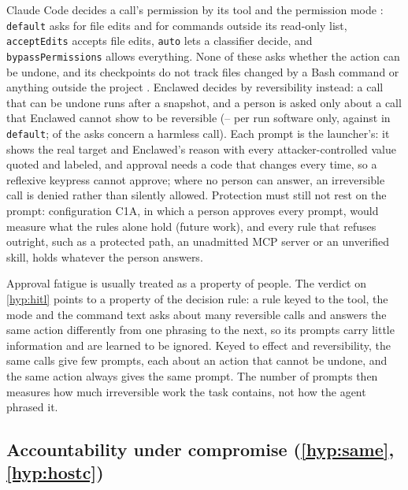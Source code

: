 \documentclass[11pt]{article}
\newcommand{\sys}{Enclawed}
\begin{document}
Claude Code decides a call's permission by its tool and the permission
mode \cite{cc-permission-modes}: \texttt{default} asks for file edits and
for commands outside its read-only list, \texttt{acceptEdits} accepts
file edits, \texttt{auto} lets a classifier decide, and
\texttt{bypassPermissions} allows everything. None of these asks whether
the action can be undone, and its checkpoints do not track files changed
by a Bash command or anything outside the project \cite{cc-checkpointing}.
\sys{} decides by reversibility instead: a call that can be undone runs
after a snapshot, and a person is asked only about a call that \sys{}
cannot show to be reversible
(\CzOneNeedPerRunMin{}--\CzOneNeedPerRunMax{} per run software only,
against \NativeDefaultNeedPerRun{} in \texttt{default};
\CzAskedHarmless{} of the \CzAsked{} asks concern a harmless call). Each
prompt is the launcher's: it shows the real target and \sys{}'s reason
with every attacker-controlled value quoted and labeled, and approval
needs a code that changes every time, so a reflexive keypress cannot
approve; where no person can answer, an irreversible call is denied
rather than silently allowed. Protection must still not rest on the
prompt: configuration C1A, in which a person approves every prompt,
would measure what the rules alone hold (future work), and every rule that refuses outright,
such as a protected path, an unadmitted MCP server or an unverified
skill, holds whatever the person answers.

Approval fatigue is usually treated as a property of people. The verdict
on \ref{hyp:hitl} points to a property of the decision rule: a rule keyed
to the tool, the mode and the command text asks about many reversible
calls and answers the same action differently from one phrasing to the
next, so its prompts carry little information and are learned to be
ignored. Keyed to effect and reversibility, the same calls give few
prompts, each about an action that cannot be undone, and the same action
always gives the same prompt. The number of prompts then measures how
much irreversible work the task contains, not how the agent phrased it.

\subsection{Accountability under compromise (\ref{hyp:same}, \ref{hyp:hostc})}
\label{sec:accountability}
\end{document}
